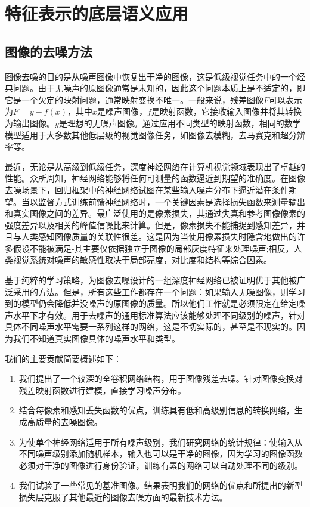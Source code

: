 \chapter{特征表示的底层语义应用}
\label{chap:Denoising}


\section{图像的去噪方法}
图像去噪的目的是从噪声图像中恢复出干净的图像，这是低级视觉任务中的一个经典问题。由于无噪声的原图像通常是未知的，因此这个问题本质上是不适定的，即它是一个欠定的映射问题，通常映射变换不唯一。一般来说，残差图像$ F $可以表示为$ F = y-f(x)$，其中$ x $是噪声图像，$ f $是映射函数，它接收输入图像并将其转换为输出图像。$ y $是理想的无噪声图像。通过应用不同类型的映射函数，相同的数学模型适用于大多数其他低层级的视觉图像任务，如图像去模糊，去马赛克和超分辨率等。

最近，无论是从高级到低级任务，深度神经网络在计算机视觉领域表现出了卓越的性能。众所周知，神经网络能够将任何可测量的函数逼近到期望的准确度\cite{Hornik1989}。在图像去噪场景下，回归框架中的神经网络试图在某些输入噪声分布下逼近潜在条件期望。当以监督方式训练前馈神经网络时，一个关键因素是选择损失函数来测量输出和真实图像之间的差异。最广泛使用的是像素损失，其通过失真和参考图像像素的强度差异以及相关的峰值信噪比\cite{Wang2004}来计算。但是，像素损失不能捕捉到感知差异，并且与人类感知图像质量的关联性很差\cite{Zhao2015,Zhanga2012}。这是因为当使用像素损失时隐含地做出的许多假设不能被满足-其主要仅依据独立于图像的局部灰度特征来处理噪声;相反，人类视觉系统对噪声的敏感性取决于局部亮度，对比度和结构等综合因素\citep{Wang2004}。

基于纯粹的学习策略，为图像去噪设计的一组深度神经网络已被证明优于其他被广泛采用的方法\cite{Burger2012}。但是，所有这些工作都存在一个问题：如果输入无噪图像，则学习到的模型仍会降低并没噪声的原图像的质量。所以他们工作就是必须限定在给定噪声水平下才有效。用于去噪声的通用标准算法应该能够处理不同级别的噪声，针对具体不同噪声水平需要一系列这样的网络，这是不切实际的，甚至是不现实的。因为我们不知道真实图像具体的噪声水平和类型。

我们的主要贡献简要概述如下：
\begin{enumerate}
\item 我们提出了一个较深的全卷积网络结构，用于图像残差去噪。针对图像变换对残差映射函数进行建模，直接学习噪声分布。
\item 结合每像素和感知丢失函数的优点，训练具有低和高级别信息的转换网络，生成高质量的去噪图像。
\item 为使单个神经网络适用于所有噪声级别，我们研究网络的统计规律：使输入从不同噪声级别添加随机样本，输入也可以是干净的图像，因为学习的图像函数必须对干净的图像进行身份验证，训练有素的网络可以自动处理不同的级别。
\item 我们试验了一些常见的基准图像。结果表明我们的网络的优点和所提出的新型损失层克服了其他最近的图像去噪方面的最新技术方法。
\end{enumerate}

